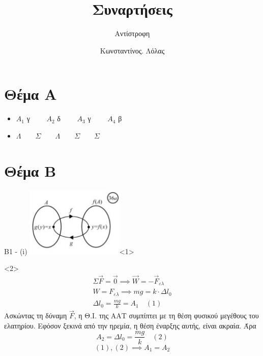 \documentclass[greek]{beamer}
\title{Συναρτήσεις}
\subtitle{Αντίστροφη}
\author[Λόλας]{Κωνσταντίνος. Λόλας}
\date{}
\begin{document}
\begin{frame}
 \titlepage
\end{frame}

\section{Θέμα Α}
\begin{frame}
 \begin{itemize}
  \item $Α_1$ γ $\qquad Α_2$ δ $\qquad Α_3$ γ $\qquad Α_4$ β
  \item $Λ \qquad Σ \qquad Λ \qquad Σ \qquad Σ$
 \end{itemize}
\end{frame}

\section{Θέμα Β}
\begin{frame}{Β1 - (i)}
\includegraphics[width=0.35\textwidth]{"images/1.3.4 Μονοτονία.png"}<1>

 \begin{onlyenv}<2>
  \begin{gather*}
   Σ\overrightarrow{F}=\overrightarrow{0}\implies \overrightarrow{W}=-\overrightarrow{F}_{ελ} \\
   W=F_{ελ}\implies mg=k\cdot Δl_0  \\
   Δl_0=\frac{mg}{k}=Α_1 \quad (1)
  \end{gather*}
  Ασκώντας τη δύναμη $\overrightarrow{F}$, η Θ.Ι. της ΑΑΤ συμπίπτει με τη θέση φυσικού μεγέθους του ελατηρίου. Εφόσον ξεκινά από την ηρεμία, η θέση έναρξης αυτής, είναι ακραία. Άρα $$Α_2=Δl_0=\frac{mg}{k} \quad (2)$$
  $$(1),(2)\implies Α_1=Α_2$$
 \end{onlyenv}
\end{frame}
\end{document}
